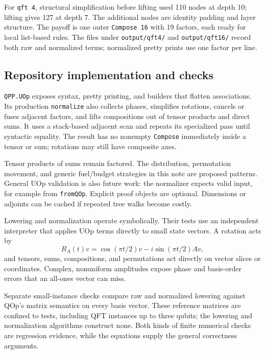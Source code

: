 \documentclass[11pt,a4paper]{article}
\newcommand{\code}[1]{\texttt{#1}}
\begin{document}
For \code{qft 4}, structural simplification before lifting used 110 nodes
at depth 10; lifting gives 127 at depth 7. The additional nodes are
identity padding and layer structure. The payoff is one outer
\code{Compose 16} with 19 factors, each ready for local list-based rules.
The files under \code{output/qft4/} and \code{output/qft16/} record both
raw and normalized terms; normalized pretty prints use one factor per line.

\subsection{Repository implementation and checks}

\label{sec:implementation}

\code{QPP.UOp} exposes syntax, pretty printing, and builders that flatten
associations. Its production \code{normalize} also collects phases,
simplifies rotations, cancels or fuses adjacent factors, and lifts
compositions out of tensor products and direct sums. It uses a stack-based
adjacent scan and repeats its specialized pass until syntactic equality.
The result has no nonempty \code{Compose} immediately inside a tensor
or sum; rotations may still have composite axes.

Tensor products of sums remain factored. The distribution, permutation
movement, and generic fuel/budget strategies in this note are proposed
patterns. General UOp validation is also future work: the normalizer
expects valid input, for example from \code{fromQOp}. Explicit proof
objects are optional. Dimensions or adjoints can be cached if repeated
tree walks become costly.

Lowering and normalization operate symbolically. Their tests use an
independent interpreter that applies UOp terms directly to small
state vectors. A rotation acts by
\[
 R_A(t)v=\cos(\pi t/2)v-i\sin(\pi t/2)Av,
\]
and tensors, sums, compositions, and permutations act directly on vector
slices or coordinates. Complex, nonuniform amplitudes expose phase and
basis-order errors that an all-ones vector can miss.

Separate small-instance checks compare raw and normalized lowering
against QOp's matrix semantics on every basis vector. These reference
matrices are confined to tests, including QFT instances up to three
qubits; the lowering and normalization algorithms construct none.
Both kinds of finite numerical checks are regression evidence, while
the equations supply the general correctness arguments.
\end{document}
